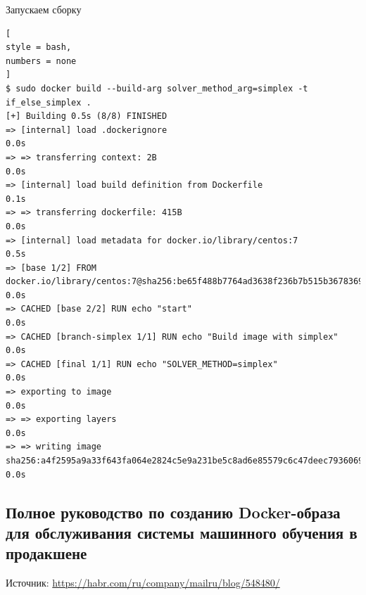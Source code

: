 \documentclass[%
	11pt,
	a4paper,
	utf8,
		]{article}
\begin{document}
Запускаем сборку
\begin{lstlisting}[
style = bash,
numbers = none
]
$ sudo docker build --build-arg solver_method_arg=simplex -t if_else_simplex .
[+] Building 0.5s (8/8) FINISHED
=> [internal] load .dockerignore                                                                                           0.0s
=> => transferring context: 2B                                                                                             0.0s
=> [internal] load build definition from Dockerfile                                                                        0.1s
=> => transferring dockerfile: 415B                                                                                        0.0s
=> [internal] load metadata for docker.io/library/centos:7                                                                 0.5s
=> [base 1/2] FROM docker.io/library/centos:7@sha256:be65f488b7764ad3638f236b7b515b3678369a5124c47b8d32916d6487418ea4      0.0s
=> CACHED [base 2/2] RUN echo "start"                                                                                      0.0s
=> CACHED [branch-simplex 1/1] RUN echo "Build image with simplex"                                                         0.0s
=> CACHED [final 1/1] RUN echo "SOLVER_METHOD=simplex"                                                                     0.0s
=> exporting to image                                                                                                      0.0s
=> => exporting layers                                                                                                     0.0s
=> => writing image sha256:a4f2595a9a33f643fa064e2824c5e9a231be5c8ad6e85579c6c47deec7936069                                0.0s
\end{lstlisting}

\subsection{Полное руководство по созданию Docker-образа для обслуживания системы машинного обучения в продакшене}

Источник: \url{https://habr.com/ru/company/mailru/blog/548480/}
\end{document}
